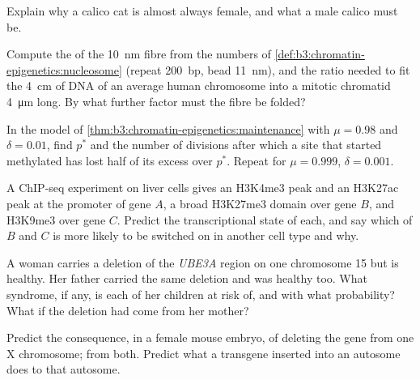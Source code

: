 \begin{exercise}[$\star$]\label{exo:b3:chromatin-epigenetics:4}
Explain why a calico cat is almost always female, and what a male
calico must be.
\end{exercise}

\begin{exercise}[$\star\star$]\label{exo:b3:chromatin-epigenetics:5}
Compute the  of the \qty{10}{nm} fibre from the numbers of
\cref{def:b3:chromatin-epigenetics:nucleosome} (repeat \qty{200}{bp},
bead \qty{11}{nm}), and the ratio needed to fit the \qty{4}{cm} of DNA
of an average human chromosome into a mitotic chromatid
\qty{4}{\micro m} long. By what further factor must the fibre be folded?
\end{exercise}

\begin{exercise}[$\star\star$]\label{exo:b3:chromatin-epigenetics:6}
In the model of \cref{thm:b3:chromatin-epigenetics:maintenance} with
$\mu = 0.98$ and $\delta = 0.01$, find $p^{*}$ and the number of
divisions after which a site that started methylated has lost half of
its excess over $p^{*}$. Repeat for $\mu = 0.999$, $\delta = 0.001$.
\end{exercise}

\begin{exercise}[$\star\star$]\label{exo:b3:chromatin-epigenetics:7}
A ChIP-seq experiment on liver cells gives an H3K4me3 peak and an
H3K27ac peak at the promoter of gene $A$, a broad H3K27me3 domain over
gene $B$, and H3K9me3 over gene $C$. Predict the transcriptional state
of each, and say which of $B$ and $C$ is more likely to be switched on
in another cell type and why.
\end{exercise}

\begin{exercise}[$\star\star$]\label{exo:b3:chromatin-epigenetics:8}
A woman carries a deletion of the \emph{UBE3A} region on one chromosome
15 but is healthy. Her father carried the same deletion and was
healthy too. What syndrome, if any, is each of her children at risk of,
and with what probability? What if the deletion had come from her
mother?
\end{exercise}

\begin{exercise}[$\star\star$]\label{exo:b3:chromatin-epigenetics:9}
Predict the consequence, in a female mouse embryo, of deleting the
\emph{} gene from one X chromosome; from both. Predict what a
\emph{} transgene inserted into an autosome does to that autosome.
\end{exercise}

